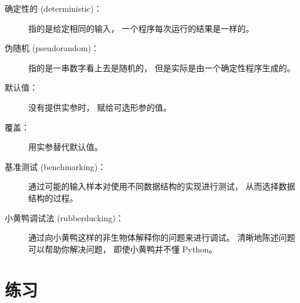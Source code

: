 {\begin{description}
\item[确定性的 (deterministic)：] 指的是给定相同的输入， 一个程序每次运行的结果是一样的。


\item[伪随机 (pseudorandom)：] 指的是一串数字看上去是随机的， 但是实际是由一个确定性程序生成的。


\item[默认值：] 没有提供实参时， 赋给可选形参的值。


\item[覆盖：] 用实参替代默认值。


\item[基准测试 (benchmarking)：] 通过可能的输入样本对使用不同数据结构的实现进行测试， 从而选择数据结构的过程。


\item[小黄鸭调试法 (rubberducking)：] 通过向小黄鸭这样的非生物体解释你的问题来进行调试。
    清晰地陈述问题可以帮助你解决问题， 即使小黄鸭并不懂 Python。

\end{description}

\section{练习}
\begin{exercise}


\end{exercise}}
